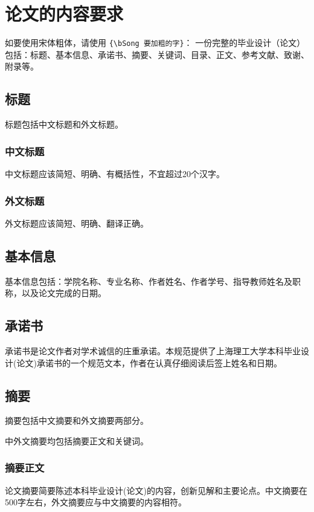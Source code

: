 \chapter{论文的内容要求}
\par 如要使用宋体粗体，请使用 \verb|{\bSong 要加粗的字}|：
{\bSong 一份完整的毕业设计（论文）包括：标题、基本信息、承诺书、摘要、关键词、目录、正文、参考文献、致谢、附录等。}

\section{标题}
\par 标题包括中文标题和外文标题。

\subsection{中文标题}
\par 中文标题应该简短、明确、有概括性，不宜超过20个汉字。

\subsection{外文标题}
\par 外文标题应该简短、明确、翻译正确。

\section{基本信息}
\par 基本信息包括：学院名称、专业名称、作者姓名、作者学号、指导教师姓名及职称，以及论文完成的日期。

\section{承诺书}
\par 承诺书是论文作者对学术诚信的庄重承诺。本规范提供了上海理工大学本科毕业设计(论文)承诺书的一个规范文本，作者在认真仔细阅读后签上姓名和日期。

\section{摘要}
\par 摘要包括中文摘要和外文摘要两部分。
\par 中外文摘要均包括摘要正文和关键词。

\subsection{摘要正文}
\par 论文摘要简要陈述本科毕业设计(论文)的内容，创新见解和主要论点。中文摘要在500字左右，外文摘要应与中文摘要的内容相符。

